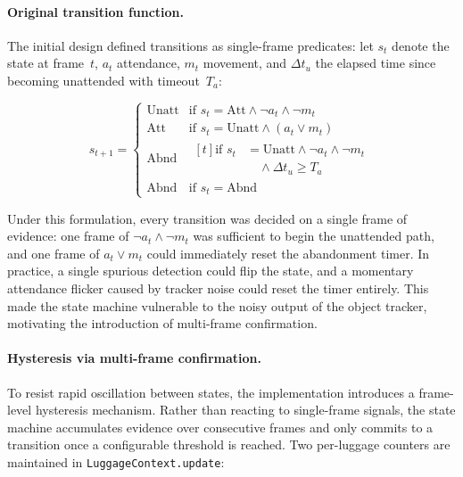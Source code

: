 \paragraph{Original transition function.}

The initial design defined transitions as single-frame predicates: let $s_t$
denote the state at frame~$t$, $a_t$ attendance, $m_t$ movement, and $\Delta
	t_u$ the elapsed time since becoming unattended with timeout~$T_a$:

\begin{small}
	\begin{equation}
		\label{eq:original_transition}
		s_{t+1} = \begin{cases}
			\text{Unatt} & \text{if } s_t = \text{Att} \wedge \neg a_t \wedge \neg m_t               \\
			\text{Att}   & \text{if } s_t = \text{Unatt} \wedge (a_t \vee m_t)                       \\
			\text{Abnd}  & \begin{aligned}[t]
				               \text{if } s_t & = \text{Unatt} \wedge \neg a_t \wedge \neg m_t \\[-0.5ex]
				                              & \quad \wedge \Delta t_u \ge T_a
			               \end{aligned} \\
			\text{Abnd}  & \text{if } s_t = \text{Abnd}
		\end{cases}
	\end{equation}
\end{small}

Under this formulation, every transition was decided on a single frame of
evidence: one frame of $\neg a_t \wedge \neg m_t$ was sufficient to begin the
unattended path, and one frame of $a_t \vee m_t$ could immediately reset the
abandonment timer. In practice, a single spurious detection could flip the
state, and a momentary attendance flicker caused by tracker noise could reset
the timer entirely. This made the state machine vulnerable to the noisy output
of the object tracker, motivating the introduction of multi-frame confirmation.

\paragraph{Hysteresis via multi-frame confirmation.}

To resist rapid oscillation between states, the implementation introduces a
frame-level hysteresis mechanism. Rather than reacting to single-frame signals,
the state machine accumulates evidence over consecutive frames and only commits
to a transition once a configurable threshold is reached. Two per-luggage
counters are maintained in \texttt{LuggageContext.update}:

